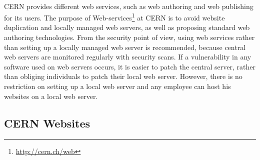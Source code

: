 \paragraph{}
CERN provides different web services, such as web authoring and web publishing for its users. The purpose of Web-services\footnote{\url{http://cern.ch/web}} at CERN is to avoid website duplication and locally managed web servers, as well as proposing standard web authoring technologies. From the security point of view, using web services rather than setting up a locally managed web server is recommended, because central web servers are monitored regularly with security scans. If a vulnerability in any software used on web servers occurs, it is easier to patch the central server, rather than obliging individuals to patch their local web server. However, there is no restriction on setting up a local web server and any employee can host his websites on a local web server. 

\subsection{CERN Websites}
